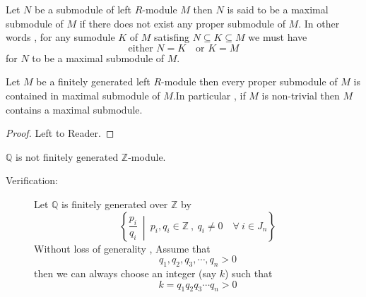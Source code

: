       \bigskip
      \begin{defn}
      Let $N$ be a submodule of left $R$-module $M$ then $N$ is said to be a maximal submodule of $M$ if there does not exist any proper submodule of $M$.\newline\bigskip
      In other words , for any sumodule $K$ of $M$ satisfing
      $N\subseteq K \subseteq M$ \newline we must have \[\text{either  } N = K \quad \text{or  } K = M  \] for $N$ to be a maximal submodule of $M$.
      \end{defn}
                   \bigskip

      \begin{thm}
        Let $M$ be a finitely generated left $R$-module then every proper submodule of $M$ is contained in maximal submodule of $M$.\newline In particular , if $M$ is non-trivial then $M$ contains a maximal submodule.
      \end{thm}
       \begin{proof}
         Left to Reader.
       \end{proof}
       \bigskip
       \begin{remark}
         $\mathbb{Q} $ is not finitely generated $\mathbb{Z}$-module.
       \end{remark}
       \begin{description}
         \item[Verification:] Let  $\mathbb{Q} $ is finitely generated over $\mathbb{Z}$ by
         \[ \left\lbrace\frac{p_i}{q_i} \ \middle\vert\ p_i , q_i \in \mathbb{Z} \ , \ q_i \neq 0 \quad \forall \ i \in J_n\right\rbrace \]      Without loss of generality , Assume that \[q_1 , q_2 , q_3 , \cdots , q_n > 0\] then we can always choose an integer (say $k$) such that
         \[k = q_1  q_2  q_3  \cdots  q_n > 0 \]
       \end{description} 